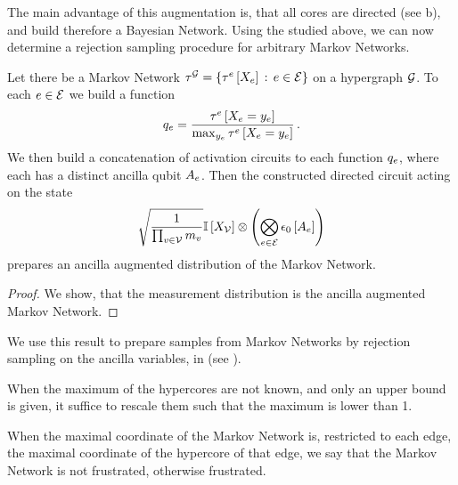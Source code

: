 The main advantage of this augmentation is, that all cores are directed (see b), and build therefore a Bayesian Network.
Using the \activationCircuits{} studied above, we can now determine a rejection sampling procedure for arbitrary Markov Networks.

\begin{lemma}
    Let there be a Markov Network $\tau^{\mathcal{G}}=\left\{\tau^{e}\left[X_{e}\right]\,:\,e\in\mathcal{E}\right\}$ on a hypergraph $\mathcal{G}$.
    To each $e\in\mathcal{E}$ we build a function
    \begin{align*}
        q_{e}
        =
        \frac{
            \tau^{e}\left[X_{e}=y_{e}\right]
        }{\max_{y_{e}}\tau^{e}\left[X_{e}=y_{e}\right]} \, .
    \end{align*}
    We then build a concatenation of activation circuits to each function $q_{e}$, where each has a distinct ancilla qubit $A_{e}$.
    Then the constructed directed circuit acting on the state
    \begin{align*}
        \sqrt{\frac{1}{\prod_{v\in\mathcal{V}}m_{v}}}\mathbb{I}\left[X_{\mathcal{V}}\right] \otimes \left(\bigotimes_{e\in\mathcal{E}}\epsilon_{0}\left[A_{e}\right]\right)
    \end{align*}
    prepares an ancilla augmented distribution of the Markov Network.
\end{lemma}
\begin{proof}
    We show, that the measurement distribution is the ancilla augmented Markov Network.
\end{proof}

We use this result to prepare samples from Markov Networks by rejection sampling on the ancilla variables, in \qcreason{} (see ).

When the maximum of the hypercores are not known, and only an upper bound is given, it suffice to rescale them such that the maximum is lower than 1.

When the maximal coordinate of the Markov Network is, restricted to each edge, the maximal coordinate of the hypercore of that edge, we say that the Markov Network is not frustrated, otherwise frustrated.

